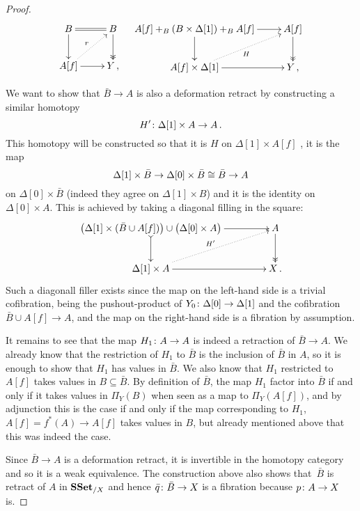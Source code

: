 \documentclass[reqno,10pt,a4paper,oneside,draft]{amsart}
\begin{document}
\begin{proof}
\[\xymatrix{
B \ar[d] \ar@{=}[r]  & B \ar@{->>}[d] \\
A[f] \ar[r] \ar@{.>}[ur]^r  & Y \, , 
} \quad \xymatrix{
\displaystyle A[f] +_B \left( B \times \Delta[1] \right) +_B A[f] \ar[d] \ar[r]  & A[f] \ar@{->>}[d] \\
A[f] \times \Delta[1] \ar[r] \ar@{.>}[ur]_H  & Y \, , 
}\]

We want to show that $\bar{B} \rightarrow A$ is also a deformation retract by constructing a similar homotopy 
\[
H' \colon \Delta[1] \times A \rightarrow A \, .
\] 
This homotopy will be constructed so that it is $H$ on $\Delta[1] \times A[f]$ ,  it is the map 
\[
\Delta[1] \times \bar{B} \rightarrow \Delta[0]  \times \bar{B} \cong \bar{B} \rightarrow A
\] 
on $\Delta[0] \times \bar{B} $ (indeed they agree on $\Delta[1] \times B$) and it is the identity on $\Delta[0] \times A$.  This is achieved by taking a diagonal filling in the square:
\[
\xymatrix@C=1.5cm{
\big( \Delta[1] \times (\bar{B} \cup A[f]) \big)  \cup \big( \Delta[0] \times A \big) \ar@{>->}[d] \ar[r] & A \ar@{->>}[d] \\
\Delta[1] \times A \ar[r] \ar@{.>}[ur]^{H'} & X \, .
}\]
Such a diagonall filler exists since the map on the left-hand side is a trivial cofibration, being the 
 pushout-product of $Y_0 \colon \Delta[0] \rightarrow \Delta[1]$ and the cofibration $\bar{B} \cup A[f] \rightarrow A$, and the map on the right-hand side is a fibration by assumption.

It remains to see that the map $H_{1} \colon A \rightarrow A$ is indeed a retraction of $\bar{B} \rightarrow A$. We already know that the restriction of $H_{1}$ to $\bar{B}$ is  the inclusion of $\bar{B}$ in $A$, so it is enough to show that $H_{1}$ has values in $\bar{B}$. We also know that $H_{1}$ restricted to $A[f]$ takes values in $B \subseteq \bar{B}$. By definition of $\bar{B}$, the map $H_1$ factor into $\bar{B}$ if and only if it takes values in $\Pi_Y(B)$ when seen as a map to $\Pi_Y(A[f])$, and by adjunction this is the case if and only if the map corresponding to $H_1$, $A[f]= f^*(A) \rightarrow A[f]$ takes values in $B$, but already mentioned above that this was indeed the case.

Since $\bar{B} \rightarrow A$ is a deformation retract, it is invertible in the homotopy category and so it is a weak equivalence. The construction above also shows that~$\bar{B}$ is retract of $A$ in $\mathbf{SSet}_{/X}$ and hence $\bar{q} \colon \bar{B} \rightarrow X$ is a fibration because $p \colon A \rightarrow X$ is.
\end{proof}
\end{document}
